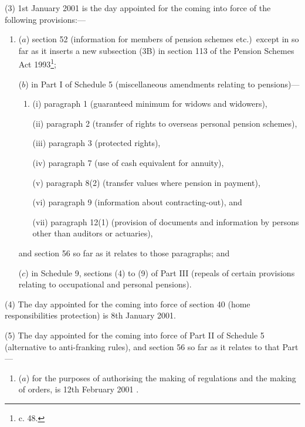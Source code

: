 \documentclass[12pt,a4paper]{article}
\begin{document}
(3) 1st January 2001 is the day appointed for the coming into force of the following provisions:—
\begin{enumerate}\item[]
($a$) section 52 (information for members of pension schemes etc.)\ except in so far as it inserts a new subsection (3B) in section 113 of the Pension Schemes Act 1993\footnote{ c. 48.};

($b$) in Part I of Schedule 5 (miscellaneous amendments relating to pensions)—
\begin{enumerate}\item[]
(i) paragraph 1 (guaranteed minimum for widows and widowers),

(ii) paragraph 2 (transfer of rights to overseas personal pension schemes),

(iii) paragraph 3 (protected rights),

(iv) paragraph 7 (use of cash equivalent for annuity),

(v) paragraph 8(2) (transfer values where pension in payment),

(vi) paragraph 9 (information about contracting-out), and

(vii) paragraph 12(1) (provision of documents and information by persons other than auditors or actuaries),
\end{enumerate}
and section 56 so far as it relates to those paragraphs; and

($c$) in Schedule 9, sections (4) to (9) of Part III (repeals of certain provisions relating to occupational and personal pensions).
\end{enumerate}

(4) The day appointed for the coming into force of section 40 (home responsibilities protection) is 8th January 2001.

(5) The day appointed for the coming into force of Part II of Schedule 5 (alternative to anti-franking rules), and section 56 so far as it relates to that Part—
\begin{enumerate}\item[]
($a$) for the purposes of authorising the making of regulations and the making of orders, is 12th February 2001%
%
.
\end{enumerate}

\end{document}
